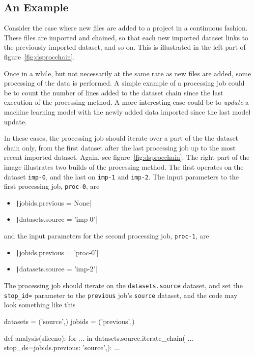 \subsection*{An Example}
Consider the case where new files are added to a project in a
continuous fashion.  These files are imported and chained, so that
each new imported dataset links to the previously imported dataset,
and so on.  This is illustrated in the left part of
figure~\ref{fig:dsprocchain}.

Once in a while, but not necessarily at the same rate as new files are
added, some processing of the data is performed.  A simple example of
a processing job could be to count the number of lines added to the
dataset chain since the last execution of the processing method.  A
more interesting case could be to \textsl{update} a machine learning
model with the newly added data imported since the last model update.

In these cases, the processing job should iterate over a part of the
the dataset chain only, from the first dataset after the last
processing job up to the most recent imported dataset.  Again, see
figure~\ref{fig:dsprocchain}.  The right part of the image illustrates
two builds of the processing method.  The first operates on the
dataset \texttt{imp-0}, and the last on \texttt{imp-1}
and \texttt{imp-2}.  The input parameters to the first processing
job, \texttt{proc-0}, are
\begin{itemize}
\item[] \texttt|jobids.previous = None|
\item[] \texttt|datasets.source = 'imp-0'|
\end{itemize}
and the input parameters for the second processing
job, \texttt{proc-1}, are
\begin{itemize}
\item[] \texttt|jobids.previous = 'proc-0'|
\item[] \texttt|datasets.source = 'imp-2'|
\end{itemize}

The processing job should iterate on the \texttt{datasets.source}
dataset, and set the \texttt{stop\_id=} parameter to
the \texttt{previous} job's \texttt{source} dataset, and the code may
look something like this
\begin{python}
datasets = ('source',)
jobids = ('previous',)

def analysis(sliceno):
    for ... in datasets.source.iterate_chain(
            ...
            stop_ds={jobids.previous: 'source',}):
    ...
\end{python}











